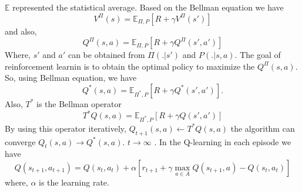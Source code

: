 \documentclass{article}
\begin{document}
  $\mathbb{E}$ represented the statistical average. 
 Based on the Bellman equation we have
 \begin{equation}
	V^{\Pi}(s) = \mathbb{E}_{\Pi,P}[R+\gamma V^{\Pi}(s')]
\end{equation}  
 and also, 
   \begin{equation}
  	Q^{\Pi}(s,a) = \mathbb{E}_{\Pi,P}[R+\gamma Q^{\Pi}(s',a')]
  \end{equation}  
  Where, $s'$ and $a'$ can be obtained from $\Pi(.|s')$ and $P(.|s,a)$.
The goal of reinforcement learnin is to obtain the optimal policy to maximize the $Q^{\Pi}(s,a)$.
So, using Bellman equation, we have
\begin{equation}
	Q^{*}(s,a) = \mathbb{E}_{\Pi^*,P}[R+\gamma Q^{*}(s',a')].
\end{equation} 
Also, $T^*$ is the Bellman operator
\begin{equation}
	T^{*}Q(s,a) = \mathbb{E}_{\Pi^*,P}[R+\gamma Q(s',a')]
\end{equation} 
By using this operator iteratively, 
$Q_{t+1}(s,a) \leftarrow T^{*}Q(s,a) $
the algorithm can converge
$Q_{t}(s,a) \rightarrow Q^*(s,a)$.
 $t \rightarrow \infty $
\cite{montague1999reinforcement,gan1}.
In the Q-learning in each episode we have
\begin{equation}
	Q(s_{t+1},a_{t+1}) = Q(s_t,a_t)+\alpha[ r_{t+1} + \gamma \max_{a \in A}{Q(s_{t+1},a)}-Q(s_t,a_t)]
\end{equation}
where, $\alpha$ is the learning rate.
\end{document}
